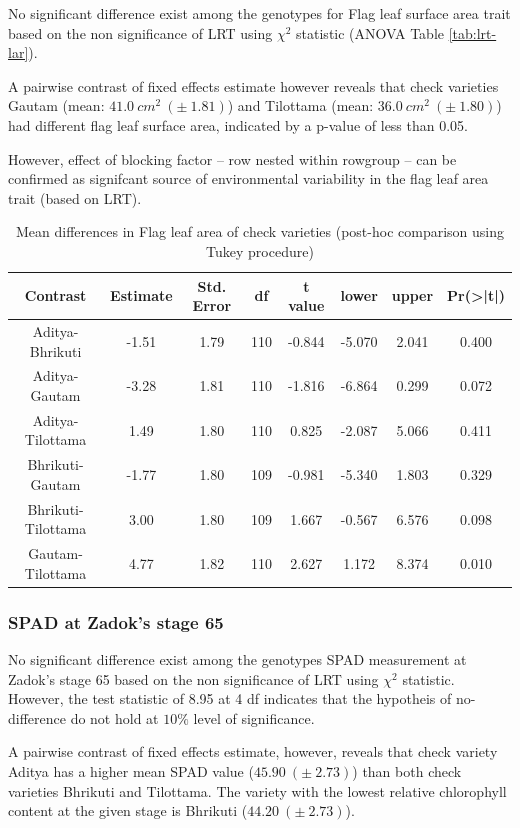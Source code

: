 \documentclass[12pt,oneside]{dukestatscithesis} %
\begin{document}
No significant difference exist among the genotypes for Flag leaf surface area trait based on the non significance of LRT using \(\chi^2\) statistic (ANOVA Table \ref{tab:lrt-lar}).

A pairwise contrast of fixed effects estimate however reveals that check varieties Gautam (mean: \(41.0\ cm^2\ (\pm\ 1.81)\)) and Tilottama (mean: \(36.0\ cm^2\ (\pm\ 1.80)\)) had different flag leaf surface area, indicated by a p-value of less than 0.05.

However, effect of blocking factor -- row nested within rowgroup -- can be confirmed as signifcant source of environmental variability in the flag leaf area trait (based on LRT).
\begin{table}[H]

\caption{\label{tab:other-meanconf-tab2}Mean differences in Flag leaf area of check varieties (post-hoc comparison using Tukey procedure)}
\centering
\begin{tabular}[t]{cccccccc}
\toprule
Contrast & Estimate & Std. Error & df & t value & lower & upper & Pr(>|t|)\\
\midrule
Aditya-Bhrikuti & -1.51 & 1.79 & 110 & -0.844 & -5.070 & 2.041 & 0.400\\
Aditya-Gautam & -3.28 & 1.81 & 110 & -1.816 & -6.864 & 0.299 & 0.072\\
Aditya-Tilottama & 1.49 & 1.80 & 110 & 0.825 & -2.087 & 5.066 & 0.411\\
Bhrikuti-Gautam & -1.77 & 1.80 & 109 & -0.981 & -5.340 & 1.803 & 0.329\\
Bhrikuti-Tilottama & 3.00 & 1.80 & 109 & 1.667 & -0.567 & 6.576 & 0.098\\
Gautam-Tilottama & 4.77 & 1.82 & 110 & 2.627 & 1.172 & 8.374 & 0.010\\
\bottomrule
\end{tabular}
\end{table}
\hypertarget{spad-at-zadoks-stage-65}{%
\subsubsection{SPAD at Zadok's stage 65}\label{spad-at-zadoks-stage-65}}

No significant difference exist among the genotypes SPAD measurement at Zadok's stage 65 based on the non significance of LRT using \(\chi^2\) statistic. However, the test statistic of 8.95 at 4 df indicates that the hypotheis of no-difference do not hold at \(10\%\) level of significance.

A pairwise contrast of fixed effects estimate, however, reveals that check variety Aditya has a higher mean SPAD value (\(45.90\ (\pm\ 2.73)\)) than both check varieties Bhrikuti and Tilottama. The variety with the lowest relative chlorophyll content at the given stage is Bhrikuti (\(44.20\ (\pm\ 2.73)\)).
\end{document}
